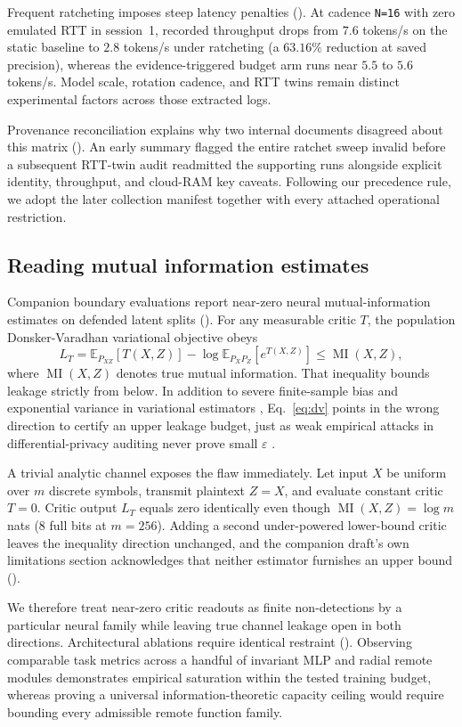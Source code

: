 Frequent ratcheting imposes steep latency penalties (). At
cadence \texttt{N=16} with zero emulated RTT in session~1, recorded
throughput drops from $7.6$ tokens/s on the static baseline to $2.8$
tokens/s under ratcheting (a $63.16\%$ reduction at saved precision),
whereas the evidence-triggered budget arm runs near $5.5$ to $5.6$
tokens/s. Model scale, rotation cadence, and RTT twins remain
distinct experimental factors across those extracted logs.

Provenance reconciliation explains why two internal documents disagreed
about this matrix (). An early summary flagged the entire
ratchet sweep invalid before a subsequent RTT-twin audit readmitted the
supporting runs alongside explicit identity, throughput, and cloud-RAM key
caveats. Following our precedence rule, we adopt the later collection
manifest together with every attached operational restriction.

\subsection{Reading mutual information estimates}

Companion boundary evaluations report near-zero neural mutual-information
estimates on defended latent splits (). For any measurable
critic $T$, the population Donsker-Varadhan variational objective obeys
\begin{equation}
 L_T=\mathbb E_{P_{XZ}}[T(X,Z)]-
 \log\mathbb E_{P_XP_Z}[e^{T(X,Z)}]\le \operatorname{MI}(X,Z),
 \label{eq:dv}
\end{equation}
where $\operatorname{MI}(X,Z)$ denotes true mutual information. That
inequality bounds leakage strictly from below. In addition to severe finite-sample bias and exponential variance in
variational estimators \cite{mcallester2020,song2020}, Eq.~\eqref{eq:dv}
points in the wrong direction to certify an upper leakage budget, just as
weak empirical attacks in differential-privacy auditing never prove small
$\varepsilon$ \cite{jagielski2020}.

A trivial analytic channel exposes the flaw immediately. Let input $X$ be
uniform over $m$ discrete symbols, transmit plaintext $Z=X$, and evaluate
constant critic $T=0$. Critic output $L_T$ equals zero identically even
though $\operatorname{MI}(X,Z)=\log m$ nats ($8$ full bits at $m=256$).
Adding a second under-powered lower-bound critic leaves the inequality
direction unchanged, and the companion draft's own limitations section
acknowledges that neither estimator furnishes an upper bound
().

We therefore treat near-zero critic readouts as finite non-detections by a
particular neural family while leaving true channel leakage open in both
directions. Architectural ablations require identical restraint
(). Observing comparable task metrics across a handful of
invariant MLP and radial remote modules demonstrates empirical saturation
within the tested training budget, whereas proving a universal
information-theoretic capacity ceiling would require bounding every
admissible remote function family.
